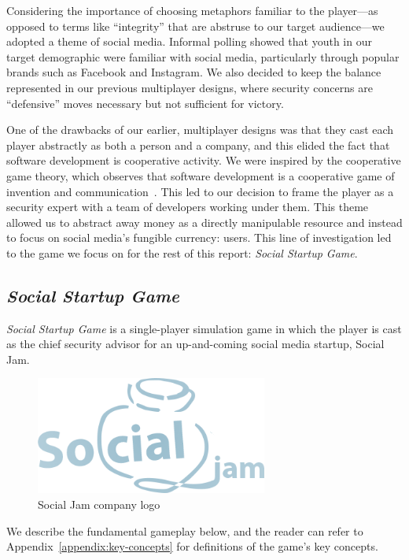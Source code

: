 \documentclass[letterpaper]{article}
\begin{document}
Considering the importance of choosing metaphors familiar to the player---as
opposed to terms like ``integrity'' that are abstruse to our target
audience---we adopted a theme of social media.
Informal polling showed that youth in our target demographic 
were familiar with social media, particularly through popular brands
such as Facebook and Instagram. 
We also decided to keep the balance represented in our previous
multiplayer designs, where security concerns are ``defensive'' moves
necessary but not sufficient for victory.

One of the drawbacks of our earlier, multiplayer designs was that they
cast each player abstractly as both a person and a company, and this
elided the fact that software development is cooperative activity.
We were inspired by the cooperative game theory, which observes
that software development is a cooperative game of invention
and communication~\citep{Cockburn2006}.
This led to our decision to frame the player as a security expert
with a team of developers working under them.
This theme allowed us to abstract away money as a directly manipulable
resource and instead to focus on social media's fungible currency: users.
This line of investigation led to the game
we focus on for the rest of this report: \textit{Social Startup Game}.

\subsection{\textit{Social Startup Game}}

\textit{Social Startup Game} is a single-player simulation game
in which the player is cast as the chief security advisor for
an up-and-coming social media startup, Social 
Jam.
%
\begin{figure}\centering
\begin{framed}
\includegraphics[width=3in]{images/company_logo.png}
\caption{Social Jam company logo}
\label{fig:social-jam}
\end{framed}
\end{figure}
%
We describe the fundamental gameplay below, and the reader can refer to 
Appendix~\ref{appendix:key-concepts} for definitions of the 
game's key concepts.
\end{document}

